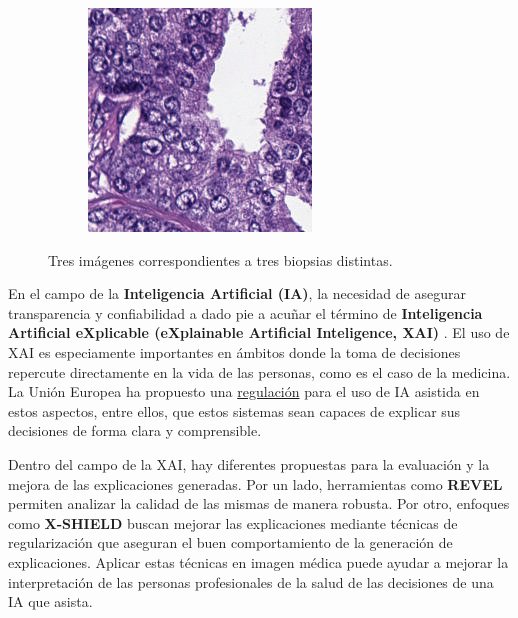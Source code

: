 \begin{figure}[H]
\begin{subfigure}[b]{0.3\textwidth}
    \end{subfigure}    
    \hfill
    \begin{subfigure}[b]{0.3\textwidth}
        \includegraphics[width=\linewidth]{images/EjemploBiopsia3.png}
    \end{subfigure}

    \caption{Tres imágenes correspondientes a tres biopsias distintas.}
    \label{fig:biopsias_ejemplos}
\end{figure}


En el campo de la \textbf{Inteligencia Artificial (IA)}, la necesidad de asegurar transparencia y confiabilidad a dado pie a acuñar el término de \textbf{Inteligencia Artificial eXplicable (eXplainable Artificial Inteligence, XAI)} \cite{XAIManifesto}. El uso de XAI es especiamente importantes en ámbitos donde la toma de decisiones repercute directamente en la vida de las personas, como es el caso de la medicina. La Unión Europea ha propuesto una \href{https://eur-lex.europa.eu/eli/reg/2024/1689/oj}{regulación} para el uso de IA asistida en estos aspectos, entre ellos, que estos sistemas sean capaces de explicar sus decisiones de forma clara y comprensible.

Dentro del campo de la XAI, hay diferentes propuestas para la evaluación y la mejora de las explicaciones generadas. Por un lado, herramientas como \textbf{REVEL} \cite{REVEL} permiten analizar la calidad de las mismas de manera robusta. Por otro, enfoques como \textbf{X-SHIELD} \cite{XSHIELD} buscan mejorar las explicaciones mediante técnicas de regularización que aseguran el buen comportamiento de la generación de explicaciones. Aplicar estas técnicas en imagen médica puede ayudar a mejorar la interpretación de las personas profesionales de la salud de las decisiones de una IA que asista.

